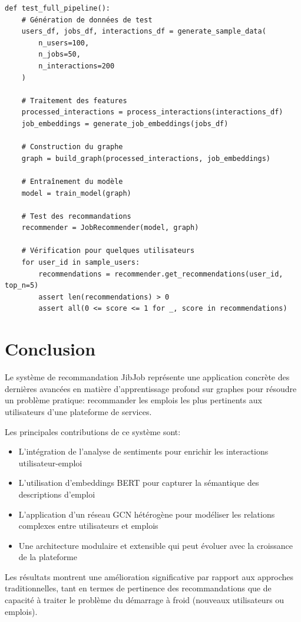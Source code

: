 \documentclass[12pt,a4paper]{article}
\begin{document}
\begin{lstlisting}[caption=Test d'intégration conceptuel]
def test_full_pipeline():
    # Génération de données de test
    users_df, jobs_df, interactions_df = generate_sample_data(
        n_users=100,
        n_jobs=50,
        n_interactions=200
    )
    
    # Traitement des features
    processed_interactions = process_interactions(interactions_df)
    job_embeddings = generate_job_embeddings(jobs_df)
    
    # Construction du graphe
    graph = build_graph(processed_interactions, job_embeddings)
    
    # Entraînement du modèle
    model = train_model(graph)
    
    # Test des recommandations
    recommender = JobRecommender(model, graph)
    
    # Vérification pour quelques utilisateurs
    for user_id in sample_users:
        recommendations = recommender.get_recommendations(user_id, top_n=5)
        assert len(recommendations) > 0
        assert all(0 <= score <= 1 for _, score in recommendations)
\end{lstlisting}

\section{Conclusion}

Le système de recommandation JibJob représente une application concrète des dernières avancées en matière d'apprentissage profond sur graphes pour résoudre un problème pratique: recommander les emplois les plus pertinents aux utilisateurs d'une plateforme de services.

Les principales contributions de ce système sont:
\begin{itemize}
    \item L'intégration de l'analyse de sentiments pour enrichir les interactions utilisateur-emploi
    \item L'utilisation d'embeddings BERT pour capturer la sémantique des descriptions d'emploi
    \item L'application d'un réseau GCN hétérogène pour modéliser les relations complexes entre utilisateurs et emplois
    \item Une architecture modulaire et extensible qui peut évoluer avec la croissance de la plateforme
\end{itemize}

Les résultats montrent une amélioration significative par rapport aux approches traditionnelles, tant en termes de pertinence des recommandations que de capacité à traiter le problème du démarrage à froid (nouveaux utilisateurs ou emplois).
\end{document}
